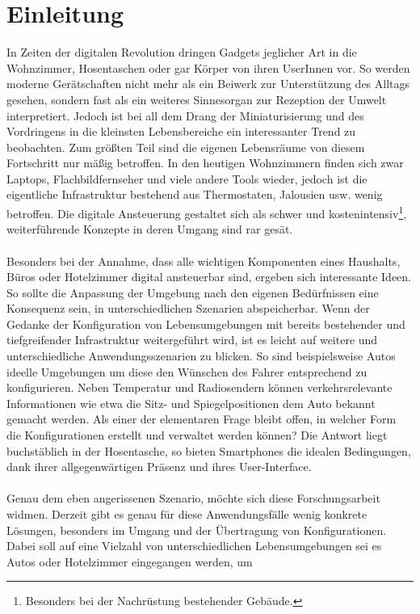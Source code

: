 \chapter{Einleitung}

In Zeiten der digitalen Revolution dringen Gadgets jeglicher Art in die Wohnzimmer, Hosentaschen oder gar Körper von ihren UserInnen vor. So werden moderne Gerätschaften 
nicht mehr als ein Beiwerk zur Unterstützung des Alltags gesehen, sondern fast als ein weiteres Sinnesorgan zur Rezeption der Umwelt interpretiert. 
Jedoch ist bei all dem Drang der Miniaturisierung und des Vordringens in die kleinsten Lebensbereiche ein interessanter Trend zu beobachten. 
Zum größten Teil sind die eigenen Lebensräume von diesem Fortschritt nur mäßig betroffen. In den heutigen Wohnzimmern finden sich zwar Laptops, Flachbildfernseher und viele andere Tools wieder, jedoch ist die eigentliche Infrastruktur bestehend aus Thermostaten, Jalousien usw. wenig betroffen. Die digitale Ansteuerung gestaltet sich als schwer und
kostenintensiv\footnote{Besonders bei der Nachrüstung bestehender Gebäude.}, weiterführende  Konzepte in deren Umgang sind rar gesät. 
\\\\
Besonders bei der Annahme, dass alle 
wichtigen Komponenten eines Haushalts, Büros oder Hotelzimmer digital ansteuerbar sind, ergeben sich interessante Ideen. So sollte die Anpassung der Umgebung nach den eigenen
Bedürfnissen eine Konsequenz sein, in unterschiedlichen Szenarien abspeicherbar. 
Wenn der Gedanke der Konfiguration von Lebensumgebungen mit bereits bestehender und tiefgreifender Infrastruktur weitergeführt wird, ist es leicht auf weitere und 
unterschiedliche Anwendungsszenarien zu blicken. 
So sind beispielsweise Autos ideelle Umgebungen um diese den Wünschen des Fahrer entsprechend zu konfigurieren. Neben Temperatur und Radiosendern können verkehrsrelevante 
Informationen wie etwa die Sitz- und Spiegelpositionen dem Auto bekannt gemacht werden. Als einer der elementaren Frage bleibt offen, in welcher Form die Konfigurationen 
erstellt und verwaltet werden können? Die Antwort liegt buchstäblich in der Hosentasche, so bieten Smartphones die idealen Bedingungen, dank ihrer allgegenwärtigen Präsenz 
und ihres User-Interface.
\\\\
Genau dem eben angerissenen Szenario, möchte sich diese Forschungsarbeit widmen. Derzeit gibt es genau für diese Anwendungsfälle wenig konkrete Lösungen, besonders im 
Umgang und der Übertragung von Konfigurationen. Dabei soll auf eine Vielzahl von unterschiedlichen Lebensumgebungen sei es Autos oder Hotelzimmer eingegangen werden, um 
